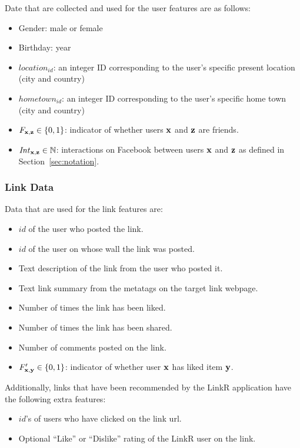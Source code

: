Date that are collected and used for the user features are as follows:
\begin{itemize}
\item {Gender:} male or female
\item {Birthday:} year
\item {$\mathit{location}_\mathit{id}$:} an integer ID corresponding
to the user's specific present location (city and country)
\item {$\mathit{hometown}_\mathit{id}$:} an integer ID corresponding
to the user's specific home town (city and country)
\item {$F_{\mathbf{x},\mathbf{z}} \in \{ 0, 1\}$:} indicator of whether 
users $\mathbf{x}$ and $\mathbf{z}$ are friends.
\item {$\mathit{Int}_{\mathbf{x},\mathbf{z}} \in \mathbb{N}$:} interactions on
Facebook between users $\mathbf{x}$ and $\mathbf{z}$ as defined in Section~\ref{sec:notation}.
\end{itemize}

\subsubsection{Link Data}

Data that are used for the link features are:
\begin{itemize}
\item{$\mathit{id}$ of the user who posted the link.}
\item{$\mathit{id}$ of the user on whose wall the link was posted.}
\item{Text description of the link from the user who posted it.}
\item{Text link summary from the metatags on the target link webpage.}
\item{Number of times the link has been liked.}
\item{Number of times the link has been shared.}
\item{Number of comments posted on the link}.
\item {$F'_{\mathbf{x},\mathbf{y}} \in \{0, 1\}$:} indicator of whether user $\mathbf{x}$ has liked item $\mathbf{y}$.
\end{itemize}
Additionally, links that have been recommended by the LinkR
application have the following extra features:
\begin{itemize}
\item{$\mathit{id}$'s of users who have clicked on the link url.}
\item{Optional ``Like'' or ``Dislike'' rating of the LinkR user on the link.}
\end{itemize}

